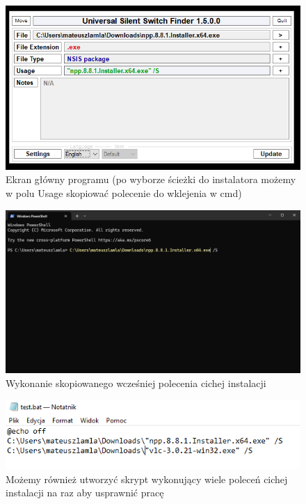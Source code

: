 \documentclass[0.82pt,a4paper]{article}
\begin{document}
    \begin{figure}[H]
        \centering
        \includegraphics[width=0.8\linewidth]{media/USSF/1.PNG}
        \caption[]{Ekran główny programu (po wyborze ścieżki do instalatora możemy w polu Usage skopiować polecenie do wklejenia w cmd)}
        \label{fig:ussf_ekran_glowny}
    \end{figure}

    \begin{figure}[H]
        \centering
        \includegraphics[width=0.8\linewidth]{media/USSF/2.PNG}
        \caption[]{Wykonanie skopiowanego wcześniej polecenia cichej instalacji}
        \label{fig:uusf_cicha_instalacja}
    \end{figure}

    \begin{figure}[H]
        \centering
        \includegraphics[width=0.8\linewidth]{media/USSF/3.PNG}
        \caption[]{Możemy również utworzyć skrypt wykonujący wiele poleceń cichej instalacji na raz aby usprawnić pracę}
        \label{fig:ussf_wiele_instalacji}
    \end{figure}
    
\end{document}
